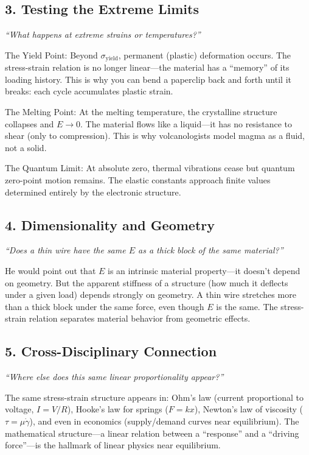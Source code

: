 \subsection*{3. Testing the Extreme Limits}
\textit{``What happens at extreme strains or temperatures?''}

The Yield Point: Beyond $\sigma_{\text{yield}}$, permanent (plastic) deformation occurs. The stress-strain relation is no longer linear---the material has a ``memory'' of its loading history. This is why you can bend a paperclip back and forth until it breaks: each cycle accumulates plastic strain.

The Melting Point: At the melting temperature, the crystalline structure collapses and $E \to 0$. The material flows like a liquid---it has no resistance to shear (only to compression). This is why volcanologists model magma as a fluid, not a solid.

The Quantum Limit: At absolute zero, thermal vibrations cease but quantum zero-point motion remains. The elastic constants approach finite values determined entirely by the electronic structure.

\subsection*{4. Dimensionality and Geometry}
\textit{``Does a thin wire have the same $E$ as a thick block of the same material?''}

He would point out that $E$ is an intrinsic material property---it doesn't depend on geometry. But the apparent stiffness of a structure (how much it deflects under a given load) depends strongly on geometry. A thin wire stretches more than a thick block under the same force, even though $E$ is the same. The stress-strain relation separates material behavior from geometric effects.

\subsection*{5. Cross-Disciplinary Connection}
\textit{``Where else does this same linear proportionality appear?''}

The same stress-strain structure appears in: Ohm's law (current proportional to voltage, $I = V/R$), Hooke's law for springs ($F = kx$), Newton's law of viscosity ($\tau = \mu \dot{\gamma}$), and even in economics (supply/demand curves near equilibrium). The mathematical structure---a linear relation between a ``response'' and a ``driving force''---is the hallmark of linear physics near equilibrium.
